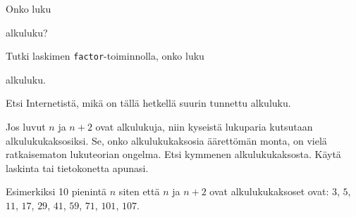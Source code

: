 \begin{tehtava}
    Onko luku
    \begin{alakohdat}
    \end{alakohdat}
    alkuluku?
    
    \begin{vastaus}
        \begin{alakohdat}
        \end{alakohdat}
    \end{vastaus}
    
\end{tehtava}

\begin{tehtava}
    Tutki laskimen {\tt factor}-toiminnolla, onko luku
    \begin{alakohdat}
    \end{alakohdat}
    alkuluku.

    \begin{vastaus}
        \begin{alakohdat}
        \end{alakohdat}
    \end{vastaus}
    
\end{tehtava}

\begin{tehtava}
    Etsi Internetistä, mikä on tällä hetkellä suurin tunnettu alkuluku.
\end{tehtava}

\begin{tehtava}
    Jos luvut $n$ ja $n + 2$ ovat alkulukuja, niin kyseistä lukuparia kutsutaan alkulukukaksosiksi. Se, onko alkulukukaksosia äärettömän monta, on vielä ratkaisematon lukuteorian ongelma. Etsi kymmenen alkulukukaksosta. Käytä laskinta tai tietokonetta apunasi.
    
    \begin{vastaus}
        Esimerkiksi 10 pienintä $n$ siten että $n$ ja $n + 2$ ovat alkulukukaksoset ovat: $3$, $5$, $11$, $17$, $29$, $41$, $59$, $71$, $101$, $107$.
    \end{vastaus}
    
\end{tehtava}

